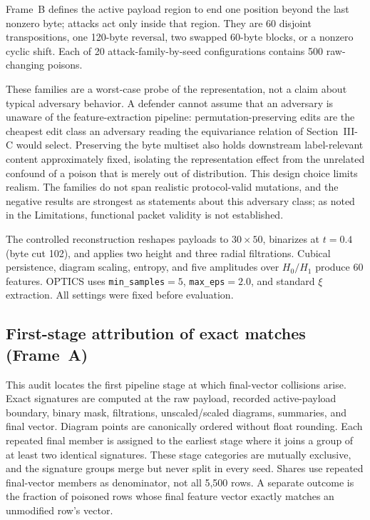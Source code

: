 \documentclass[conference]{IEEEtran}
\begin{document}
Frame~B defines the active payload region to end one position beyond the last
nonzero byte; attacks act only inside that region. They are 60 disjoint transpositions, one
120-byte reversal, two swapped 60-byte blocks, or a nonzero cyclic shift.
Each of 20 attack-family-by-seed configurations contains 500 raw-changing poisons.

These families are a worst-case probe of the representation, not a claim about
typical adversary behavior. A defender cannot assume that an adversary is
unaware of the feature-extraction pipeline: permutation-preserving edits are the cheapest edit
class an adversary reading the equivariance relation of Section~III-C would select. Preserving
the byte multiset also holds downstream label-relevant content approximately
fixed, isolating the representation effect from the unrelated confound of a
poison that is merely out of distribution. This design choice limits realism. The
families do not span realistic protocol-valid mutations, and the negative
results are strongest as statements about this adversary class; as noted in
the Limitations, functional packet validity is not established.

The controlled reconstruction reshapes payloads to $30\times50$, binarizes at
$t=0.4$ (byte cut 102), and applies two height and three radial filtrations.
Cubical persistence, diagram scaling, entropy, and five amplitudes over
$H_0/H_1$ produce 60 features. OPTICS uses
\texttt{min\_samples}$=5$, \texttt{max\_eps}$=2.0$, and standard
$\xi$ extraction. All settings were fixed before evaluation.

\subsection{First-stage attribution of exact matches (Frame~A)}
This audit locates the first pipeline stage at which final-vector collisions arise.
Exact signatures are computed at the raw payload, recorded active-payload
boundary, binary mask,
filtrations, unscaled/scaled diagrams, summaries, and final vector. Diagram
points are canonically ordered without float rounding. Each repeated final
member is assigned to the earliest stage where it joins a group of at least two
identical signatures. These stage categories are mutually exclusive, and the
signature groups merge but never split in every seed.
Shares use repeated final-vector members as denominator, not all 5,500 rows.
A separate outcome is the fraction of poisoned rows whose final feature vector
exactly matches an unmodified row's vector.
\end{document}
